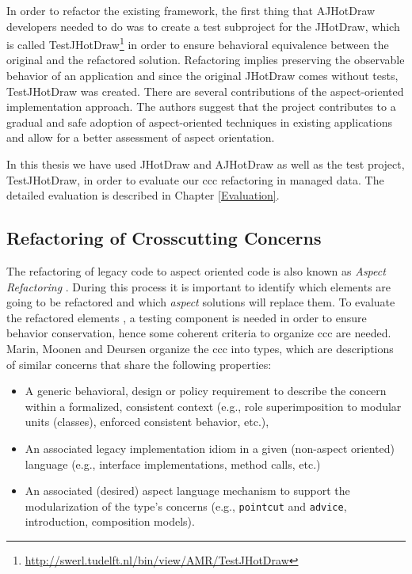In order to refactor the existing framework, the first thing that AJHotDraw developers needed to do was to create a test subproject for the JHotDraw, which is called TestJHotDraw\footnote{\url{http://swerl.tudelft.nl/bin/view/AMR/TestJHotDraw}} in order to ensure behavioral equivalence between the original and the refactored solution. 
Refactoring implies preserving the observable behavior of an application\cite{fowler2009refactoring} and since the original JHotDraw comes without tests, TestJHotDraw was created. 
There are several contributions of the aspect-oriented implementation approach\cite{marinajhotdraw}. 
The authors suggest that the project contributes to a gradual and safe adoption of aspect-oriented techniques in existing applications and allow for a better assessment of aspect orientation.

In this thesis we have used JHotDraw and AJHotDraw as well as the test project, TestJHotDraw, in order to evaluate our \ac{ccc} refactoring in managed data.
The detailed evaluation is described in Chapter \ref{Evaluation}.

\subsection{Refactoring of Crosscutting Concerns}\label{Refactoring of ccc}
The refactoring of legacy code to aspect oriented code is also known as \textit{Aspect Refactoring} \cite{marin2005approach}. 
During this process it is important to identify which elements are going to be refactored and which \textit{aspect} solutions will replace them. 
To evaluate the refactored elements \cite{fowler2009refactoring}, a testing component is needed in order to ensure behavior conservation, hence some coherent criteria to organize \ac{ccc} are needed. 
Marin, Moonen and Deursen \cite{marin2005approach} organize the \ac{ccc} into types, which are descriptions of similar concerns that share the following properties: 

\begin{itemize}
	\item A generic behavioral, design or policy requirement to describe the concern within a formalized, consistent context (e.g., role superimposition to modular units (classes), enforced consistent behavior, etc.),

	\item An associated legacy implementation idiom in a given (non-aspect oriented) language (e.g., interface implementations, method calls, etc.)

	\item An associated (desired) aspect language mechanism to support the modularization of the type's concerns (e.g., \texttt{pointcut} and \texttt{advice}, introduction, composition models).
\end{itemize}

